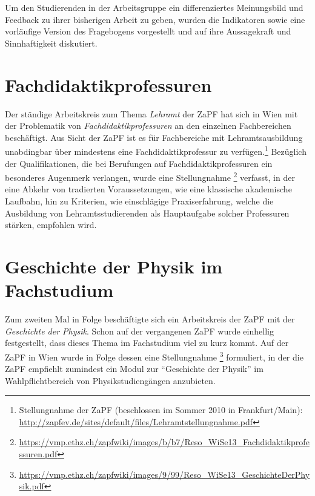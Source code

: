 \documentclass{scrartcl}
\begin{document}
Um den Studierenden in der Arbeitsgruppe ein differenziertes Meinungsbild und Feedback zu ihrer bisherigen Arbeit zu geben, wurden die Indikatoren sowie eine vorl\"aufige Version des Fragebogens vorgestellt und auf ihre Aussagekraft und Sinnhaftigkeit diskutiert.

\section*{Fachdidaktikprofessuren}
Der st\"andige Arbeitskreis zum Thema \emph{Lehramt} der ZaPF hat sich in Wien mit der Problematik von \emph{Fachdidaktikprofessuren} an den einzelnen Fachbereichen besch\"aftigt. Aus Sicht der ZaPF ist es f\"ur Fachbereiche mit Lehramtsausbildung unabdingbar \"uber mindestens eine Fachdidaktikprofessur zu verf\"ugen.\footnote{Stellungnahme der ZaPF (beschlossen im Sommer 2010 in Frankfurt/Main): \href{http://zapfev.de/sites/default/files/Lehramtstellungnahme.pdf}{\url{http://zapfev.de/sites/default/files/Lehramtstellungnahme.pdf}}}
Bez\"uglich der Qualifikationen, die bei Berufungen auf Fachdidaktikprofessuren ein besonderes Augenmerk verlangen, wurde eine Stellungnahme \footnote{\href{https://vmp.ethz.ch/zapfwiki/images/b/b7/Reso_WiSe13_Fachdidaktikprofessuren.pdf}{\url{https://vmp.ethz.ch/zapfwiki/images/b/b7/Reso_WiSe13_Fachdidaktikprofessuren.pdf}}} verfasst, in der eine Abkehr von tradierten Voraussetzungen, wie eine klassische akademische Laufbahn, hin zu Kriterien, wie einschl\"agige Praxiserfahrung, welche die Ausbildung von Lehramtsstudierenden als Hauptaufgabe solcher Professuren st\"arken, empfohlen wird.

\section*{Geschichte der Physik im Fachstudium}
Zum zweiten Mal in Folge besch\"aftigte sich ein Arbeitskreis der ZaPF mit der \emph{Geschichte der Physik}. Schon auf der vergangenen ZaPF wurde einhellig festgestellt, dass dieses Thema im Fachstudium viel zu kurz kommt. Auf der ZaPF in Wien wurde in Folge dessen eine Stellungnahme \footnote{\href{https://vmp.ethz.ch/zapfwiki/images/9/99/Reso_WiSe13_GeschichteDerPhysik.pdf}{\url{https://vmp.ethz.ch/zapfwiki/images/9/99/Reso_WiSe13_GeschichteDerPhysik.pdf}}} formuliert, in der die ZaPF empfiehlt zumindest ein Modul zur "`Geschichte der Physik"' im Wahlpflichtbereich von Physikstudieng\"angen anzubieten.
\end{document}
